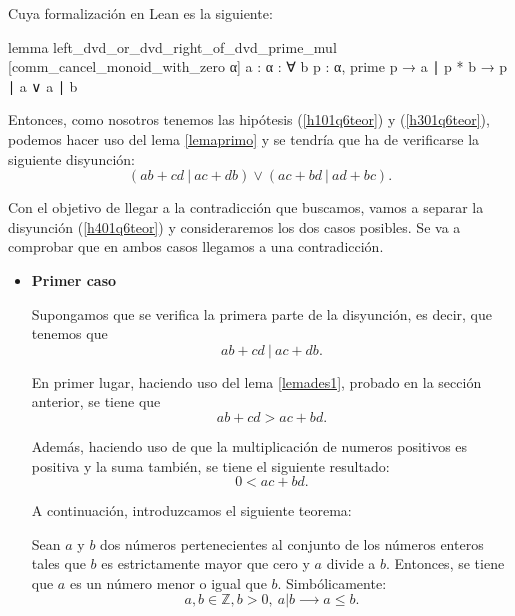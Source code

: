 \begin{demostracion}
  Cuya formalización en Lean es la siguiente:
  \begin{leancode}
  lemma left_dvd_or_dvd_right_of_dvd_prime_mul
  [comm_cancel_monoid_with_zero α] {a : α} :
  ∀ {b p : α}, prime p → a ∣ p * b → p ∣ a ∨ a ∣ b 
  \end{leancode}

  Entonces, como nosotros tenemos las hipótesis (\ref{h101q6teor}) y
  (\ref{h301q6teor}), podemos hacer uso del lema \ref{lemaprimo} y se tendría
  que ha de verificarse la siguiente disyunción:
  \begin{equation}\tag{h4}\label{h401q6teor}
    (ab+cd\ |\ ac+db) \lor (ac+bd\ |\ ad+bc).
  \end{equation}

  Con el objetivo de llegar a la contradicción que buscamos, vamos a separar
  la disyunción (\ref{h401q6teor}) y consideraremos los dos casos posibles.
  Se va a comprobar que en ambos casos llegamos a una contradicción.
  \begin{itemize}
  \item \textbf{Primer caso}
    
    Supongamos que se verifica la primera parte de la disyunción, es decir,
    que tenemos que
    \begin{equation}\tag{hj}\label{hj01q6teor}
      ab+cd\ |\ ac+db.
    \end{equation}

    En primer lugar, haciendo uso del lema \ref{lemades1}, probado en la
    sección anterior, se tiene que
    \begin{equation}\tag{hj1}\label{hj101q6}
      ab+cd > ac+bd.
    \end{equation}
    
    Además, haciendo uso de que la multiplicación de numeros positivos es
    positiva y la suma también, se tiene el siguiente resultado:
    \begin{equation}\label{hpj01q6}\tag{hpj}
      0 < ac+bd.
    \end{equation}

    A continuación, introduzcamos el siguiente teorema:
    \begin{teorema}\label{teoremaleq}
      Sean \(a\) y \(b\) dos números pertenecientes al conjunto de los
      números enteros tales que \(b\) es estrictamente mayor que cero y
      \(a\) divide a \(b\). Entonces, se tiene que \(a\) es un número menor
      o igual que \(b\). Simbólicamente:
      \begin{equation}
        a,b ∈ ℤ, b>0,\ a|b ⟶ a≤b.
      \end{equation}
    \end{teorema}


\end{itemize}
\end{demostracion}
